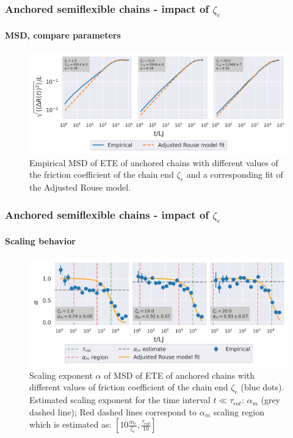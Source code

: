 \documentclass[handout]{beamer}
\begin{document}

\begin{frame}
    \frametitle{Anchored semiflexible chains - impact of $\zeta_e$}
    \framesubtitle{MSD, compare parameters}
    \begin{figure}[h]
        \includegraphics[width=\textwidth]{14+15+16-exp-msd-log-arm_fit-log.png}
        \caption{Empirical MSD of ETE of anchored chains with different values of
        the friction coefficient of the chain end $\zeta_e$ and a corresponding fit
        of the Adjusted Rouse model.
        }
    \end{figure}
\end{frame}


\begin{frame}
    \frametitle{Anchored semiflexible chains - impact of $\zeta_e$}
    \framesubtitle{Scaling behavior}
    \begin{figure}[h]
        \includegraphics[width=\textwidth]{14+15+16-exp-alpha.png}
        \caption{Scaling exponent $\alpha$ of MSD of ETE 
        of anchored chains with different values of
        friction coefficient of the chain end $\zeta_e$ (blue dots).
        Estimated scaling exponent for the time interval
        $t \ll \tau_{rot}$: $\alpha_m$ (grey dashed line); Red dashed lines
        correspond to $\alpha_m$ scaling region which is estimated as:
        $[10 \frac{m_e}{\zeta_e}, \frac{\tau_{rot}}{10}]$
        }
    \end{figure}
\end{frame}
\end{document}
